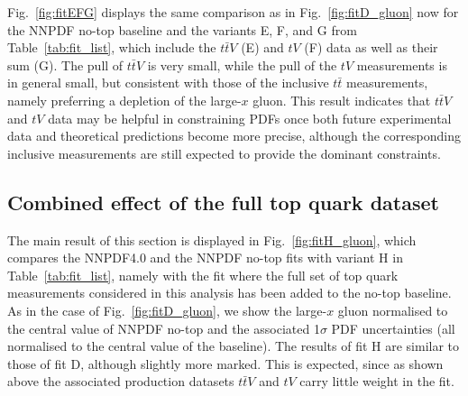 \documentclass[withindex,glossary]{cam-thesis}
\begin{document}
Fig.~\ref{fig:fitEFG} displays the same comparison as in
Fig.~\ref{fig:fitD_gluon} now for the NNPDF no-top baseline
and the variants E, F, and G from Table~\ref{tab:fit_list}, which 
include the $t\bar{t}V$ (E) and $tV$ (F) data
as well as their sum (G).
%
The pull of $t\bar{t}V$ is very small, while the pull of the $tV$
measurements is in general small, but consistent
with those of the inclusive  $t\bar{t}$ measurements, namely preferring a
depletion of the large-$x$ gluon.
%
This result indicates that $t\bar{t}V$  and $tV$  data may be
helpful in constraining PDFs once both future experimental data 
and theoretical predictions become more precise, although
the corresponding inclusive measurements are still expected to provide
the dominant constraints. 

\subsection{Combined effect of the full top quark dataset}
\label{sec:alltop}

The main result of this section is displayed in Fig.~\ref{fig:fitH_gluon},
which compares the NNPDF4.0 and the NNPDF no-top fits with variant H in
Table~\ref{tab:fit_list},
namely with the fit where the full set of top quark measurements considered
in this analysis has been added to the no-top baseline.
%
As in the case of Fig.~\ref{fig:fitD_gluon}, we show the large-$x$ gluon
normalised to the central value of NNPDF no-top and the associated
1$\sigma$ PDF uncertainties (all normalised to the central value of the
baseline).
%
The results of fit H are similar to those of fit D, although slightly
more marked. This is expected, 
since as shown above the associated production datasets $t\bar{t}V$
and $tV$ carry little weight in the fit.
\end{document}
